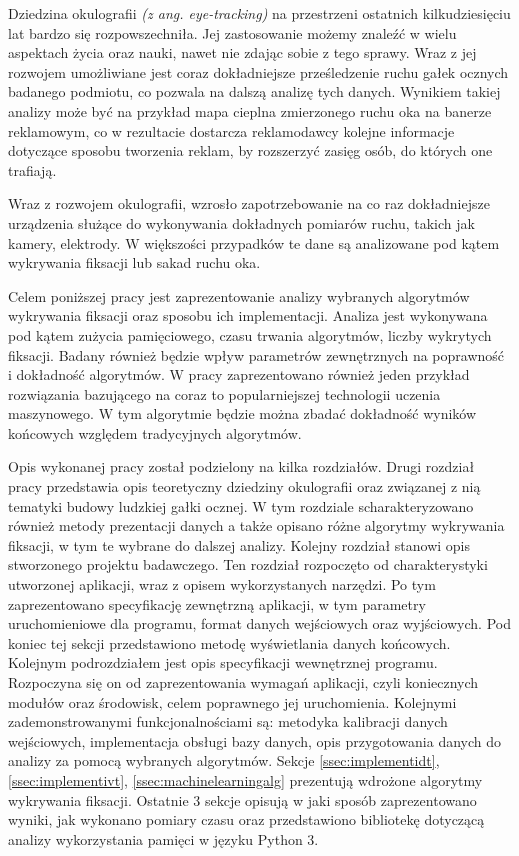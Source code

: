 \label{chapter:ch1}
Dziedzina okulografii \textit{(z ang. eye-tracking)} na przestrzeni ostatnich kilkudziesięciu lat bardzo się rozpowszechniła. Jej zastosowanie możemy znaleźć w wielu aspektach życia oraz nauki, nawet nie zdając sobie z tego sprawy. Wraz z jej rozwojem umożliwiane jest coraz dokładniejsze prześledzenie ruchu gałek ocznych badanego podmiotu, co pozwala na dalszą analizę tych danych. Wynikiem takiej analizy może być na przykład mapa cieplna zmierzonego ruchu oka na banerze reklamowym, co w rezultacie dostarcza reklamodawcy kolejne informacje dotyczące sposobu tworzenia reklam, by rozszerzyć zasięg osób, do których one trafiają.\par
Wraz z rozwojem okulografii, wzrosło zapotrzebowanie na co raz dokładniejsze urządzenia służące do wykonywania dokładnych pomiarów ruchu, takich jak kamery, elektrody. W większości przypadków te dane są analizowane pod kątem wykrywania fiksacji lub sakad ruchu oka.\par
Celem poniższej pracy jest zaprezentowanie analizy wybranych algorytmów wykrywania fiksacji oraz sposobu ich implementacji. Analiza jest wykonywana pod kątem zużycia pamięciowego, czasu trwania algorytmów, liczby wykrytych fiksacji. Badany również będzie wpływ parametrów zewnętrznych na poprawność i dokładność algorytmów. W pracy zaprezentowano również jeden przykład rozwiązania bazującego na coraz to popularniejszej technologii uczenia maszynowego. W tym algorytmie będzie można zbadać dokładność wyników końcowych względem tradycyjnych algorytmów.\par
Opis wykonanej pracy został podzielony na kilka rozdziałów. Drugi rozdział pracy przedstawia opis teoretyczny dziedziny okulografii oraz związanej z nią tematyki budowy ludzkiej gałki ocznej. W tym rozdziale scharakteryzowano również metody prezentacji danych a także opisano różne algorytmy wykrywania fiksacji, w tym te wybrane do dalszej analizy. Kolejny rozdział stanowi opis stworzonego projektu badawczego. Ten rozdział rozpoczęto od charakterystyki utworzonej aplikacji, wraz z opisem wykorzystanych narzędzi. Po tym zaprezentowano specyfikację zewnętrzną aplikacji, w tym parametry uruchomieniowe dla programu, format danych wejściowych oraz wyjściowych. Pod koniec tej sekcji przedstawiono metodę wyświetlania danych końcowych. Kolejnym podrozdziałem jest opis specyfikacji wewnętrznej programu. Rozpoczyna się on od zaprezentowania wymagań aplikacji, czyli koniecznych modułów oraz środowisk, celem poprawnego jej uruchomienia. Kolejnymi zademonstrowanymi funkcjonalnościami są: metodyka kalibracji danych wejściowych, implementacja obsługi bazy danych, opis przygotowania danych do analizy za pomocą wybranych algorytmów. Sekcje \ref{ssec:implementidt}, \ref{ssec:implementivt}, \ref{ssec:machinelearningalg} prezentują wdrożone algorytmy wykrywania fiksacji. Ostatnie 3 sekcje opisują w jaki sposób zaprezentowano wyniki, jak wykonano pomiary czasu oraz  przedstawiono bibliotekę dotyczącą analizy wykorzystania pamięci w języku Python 3.\\

